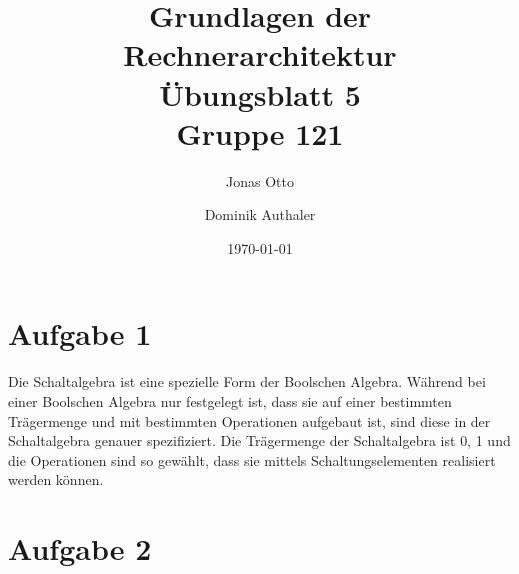 \documentclass[a4paper]{article}
\title{Grundlagen der Rechnerarchitektur\\ Übungsblatt 5\\Gruppe 121\\}
\author{Jonas Otto\and Dominik Authaler}
\date{\today}
\begin{document}
\maketitle

\section*{Aufgabe 1}
Die Schaltalgebra ist eine spezielle Form der Boolschen Algebra. Während bei einer Boolschen Algebra nur festgelegt ist, dass sie auf einer bestimmten Trägermenge und mit bestimmten Operationen aufgebaut ist, sind diese in der Schaltalgebra genauer spezifiziert. Die Trägermenge der Schaltalgebra ist {0, 1} und die Operationen sind so gewählt, dass sie mittels Schaltungselementen realisiert werden können.

\section*{Aufgabe 2}
\end{document}
